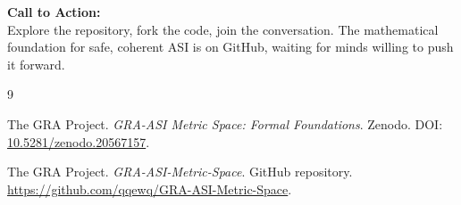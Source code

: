\documentclass[11pt,a4paper]{article}
\begin{document}
\vspace{1em}
\noindent\textbf{Call to Action:}\\
Explore the repository, fork the code, join the conversation. The mathematical foundation for safe, coherent ASI is on GitHub, waiting for minds willing to push it forward.

\begin{thebibliography}{9}

The GRA Project. \textit{GRA-ASI Metric Space: Formal Foundations}. Zenodo. DOI: \href{https://doi.org/10.5281/zenodo.20567157}{10.5281/zenodo.20567157}.

The GRA Project. \textit{GRA-ASI-Metric-Space}. GitHub repository. \url{https://github.com/qqewq/GRA-ASI-Metric-Space}.

\end{thebibliography}
\end{document}
